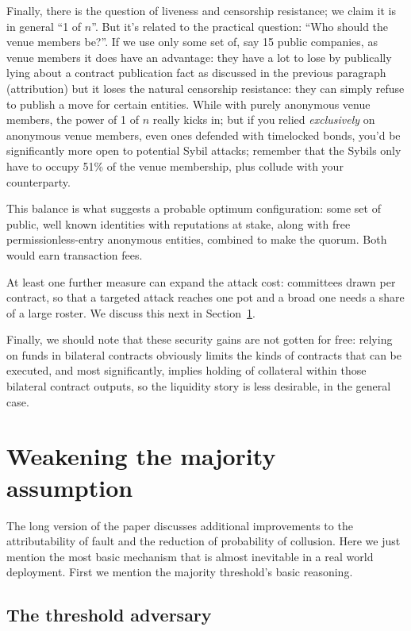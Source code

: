 \documentclass[11pt]{article}
\begin{document}
Finally, there is the question of liveness and censorship resistance; we claim it is in general ``1 of $n$''. But it's related to the practical question: ``Who should the venue members be?''. If we use only some set of, say 15 public companies, as venue members it does have an advantage: they have a lot to lose by publically lying about a contract publication fact as discussed in the previous paragraph (attribution) but it loses the natural censorship resistance: they can simply refuse to publish a move for certain entities. While with purely anonymous venue members, the power of 1 of $n$ really kicks in; but if you relied \emph{exclusively} on anonymous venue members, even ones defended with timelocked bonds, you'd be significantly more open to potential Sybil attacks; remember that the Sybils only have to occupy 51\% of the venue membership, plus collude with your counterparty.

This balance is what suggests a probable optimum configuration: some set of public, well known identities with reputations at stake, along with free permissionless-entry anonymous entities, combined to make the quorum. Both would earn transaction fees.

At least one further measure can expand the attack cost: committees drawn per contract, so that a targeted attack reaches one pot and a broad one needs a share of a large roster. We discuss this next in Section~\ref{sec:accountable}.

Finally, we should note that these security gains are not gotten for free: relying on funds in bilateral contracts obviously limits the kinds of contracts that can be executed, and most significantly, implies holding of collateral within those bilateral contract outputs, so the liquidity story is less desirable, in the general case.

\section{Weakening the majority assumption}
\label{sec:accountable}

The long version of the paper discusses additional improvements to the attributability of fault and the reduction of probability of collusion. Here we just mention the most basic mechanism that is almost inevitable in a real world deployment. First we mention the majority threshold's basic reasoning.

\subsection{The threshold adversary}
\label{sec:threshold}
\end{document}
